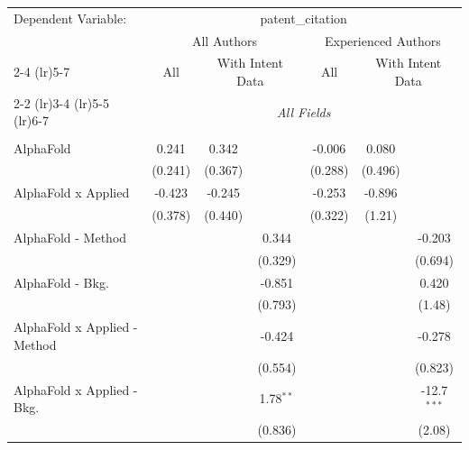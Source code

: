 \begingroup
\centering
\begin{tabular}{lcccccc}
   \tabularnewline \midrule \midrule
   Dependent Variable: & \multicolumn{6}{c}{patent\_citation}\\
 & \multicolumn{3}{c}{All Authors} & \multicolumn{3}{c}{Experienced Authors} \\
\cmidrule(lr){2-4} \cmidrule(lr){5-7}
 & \multicolumn{1}{c}{All} & \multicolumn{2}{c}{With Intent Data} & \multicolumn{1}{c}{All} & \multicolumn{2}{c}{With Intent Data} \\
\cmidrule(lr){2-2} \cmidrule(lr){3-4} \cmidrule(lr){5-5} \cmidrule(lr){6-7}
 & \multicolumn{6}{c}{\textit{All Fields}} \\ \\
   AlphaFold                      & 0.241   & 0.342       &             & -0.006       & 0.080         &   \\   
                                  & (0.241) & (0.367)     &             & (0.288)      & (0.496)       &   \\   
   AlphaFold x Applied            & -0.423  & -0.245      &             & -0.253       & -0.896        &   \\   
                                  & (0.378) & (0.440)     &             & (0.322)      & (1.21)        &   \\   
   AlphaFold - Method             &         &             & 0.344       &              &               & -0.203\\   
                                  &         &             & (0.329)     &              &               & (0.694)\\   
   AlphaFold - Bkg.               &         &             & -0.851      &              &               & 0.420\\   
                                  &         &             & (0.793)     &              &               & (1.48)\\   
   AlphaFold x Applied - Method   &         &             & -0.424      &              &               & -0.278\\   
                                  &         &             & (0.554)     &              &               & (0.823)\\   
   AlphaFold x Applied - Bkg.     &         &             & 1.78$^{**}$ &              &               & -12.7$^{***}$\\   
                                  &         &             & (0.836)     &              &               & (2.08)\\   

\end{tabular}

